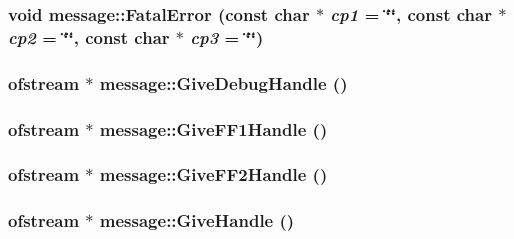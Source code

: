 \label{classmessage_a8353517a95f66390d9e9add3276da11e}
\hypertarget{classmessage_a858cde36543e084d30fcb2693ee08fdc}{
\subsubsection[{FatalError}]{\setlength{\rightskip}{0pt plus 5cm}void message::FatalError (const char $\ast$ {\em cp1} = {\ttfamily \char`\"{}\char`\"{}}, \/  const char $\ast$ {\em cp2} = {\ttfamily \char`\"{}\char`\"{}}, \/  const char $\ast$ {\em cp3} = {\ttfamily \char`\"{}\char`\"{}})}}
\label{classmessage_a858cde36543e084d30fcb2693ee08fdc}
\hypertarget{classmessage_a176f7e9a4dfa77ef53b3cf98e8ab77d6}{
\subsubsection[{GiveDebugHandle}]{\setlength{\rightskip}{0pt plus 5cm}ofstream $\ast$ message::GiveDebugHandle ()}}
\label{classmessage_a176f7e9a4dfa77ef53b3cf98e8ab77d6}
\hypertarget{classmessage_a453ef3576d87c4927a6afc1f8f111d5e}{
\subsubsection[{GiveFF1Handle}]{\setlength{\rightskip}{0pt plus 5cm}ofstream $\ast$ message::GiveFF1Handle ()}}
\label{classmessage_a453ef3576d87c4927a6afc1f8f111d5e}
\hypertarget{classmessage_a4e0e2e4816d10ba57486c618e844d45c}{
\subsubsection[{GiveFF2Handle}]{\setlength{\rightskip}{0pt plus 5cm}ofstream $\ast$ message::GiveFF2Handle ()}}
\label{classmessage_a4e0e2e4816d10ba57486c618e844d45c}
\hypertarget{classmessage_a9c4d08163cff8ee8dba9eb8b6317a8b9}{
\subsubsection[{GiveHandle}]{\setlength{\rightskip}{0pt plus 5cm}ofstream $\ast$ message::GiveHandle ()}}
